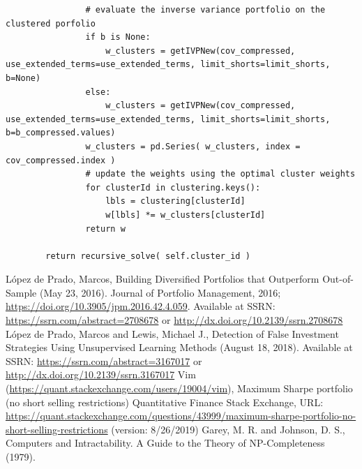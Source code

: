 \documentclass[10pt,twoside,titlepage]{article}   %
\begin{document}
\begin{lstlisting}
                # evaluate the inverse variance portfolio on the clustered porfolio
                if b is None:
                    w_clusters = getIVPNew(cov_compressed, use_extended_terms=use_extended_terms, limit_shorts=limit_shorts, b=None)
                else:
                    w_clusters = getIVPNew(cov_compressed, use_extended_terms=use_extended_terms, limit_shorts=limit_shorts, b=b_compressed.values)
                w_clusters = pd.Series( w_clusters, index = cov_compressed.index )
                # update the weights using the optimal cluster weights
                for clusterId in clustering.keys():
                    lbls = clustering[clusterId]
                    w[lbls] *= w_clusters[clusterId]
                return w

        return recursive_solve( self.cluster_id )
\end{lstlisting}

\begin{thebibliography}{9}
L\'opez de Prado, Marcos, Building Diversified Portfolios that Outperform Out-of-Sample (May 23, 2016). Journal of Portfolio Management, 2016; \url{https://doi.org/10.3905/jpm.2016.42.4.059}. 
Available at SSRN: \url{https://ssrn.com/abstract=2708678} or \url{http://dx.doi.org/10.2139/ssrn.2708678}
L\'opez de Prado, Marcos and Lewis, Michael J., Detection of False Investment Strategies Using Unsupervised Learning Methods (August 18, 2018). 
Available at SSRN: \url{https://ssrn.com/abstract=3167017} or \url{http://dx.doi.org/10.2139/ssrn.3167017}
Vim (\url{https://quant.stackexchange.com/users/19004/vim}), Maximum Sharpe portfolio (no short selling restrictions) 
Quantitative Finance Stack Exchange, URL: \url{https://quant.stackexchange.com/questions/43999/maximum-sharpe-portfolio-no-short-selling-restrictions} (version: 8/26/2019)
Garey, M. R. and Johnson, D. S., Computers and Intractability. A Guide to the Theory of NP-Completeness (1979).
\end{thebibliography}
\end{document}
